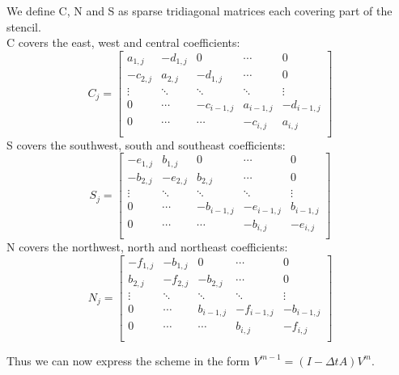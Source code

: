 \documentclass{article}
\begin{document}
\begin{enumerate}
We define C, N and S as sparse tridiagonal matrices each covering part of the stencil. \\
C covers the east, west and central coefficients:
\[
C_j = 
\begin{bmatrix}
    a_{1,j} & -d_{1,j} &0&\cdots&0 \\
    -c_{2,j} & a_{2,j} & -d_{1,j} &\cdots&0 \\
    \vdots & \ddots & \ddots & \ddots &\vdots \\
    0&\cdots&-c_{i-1,j} & a_{i-1,j} & -d_{i-1,j}\\
    0&\cdots&\cdots&-c_{i,j} & a_{i,j}\\
\end{bmatrix}\] 
S covers the southwest, south and southeast coefficients:
\[
S_j = 
\begin{bmatrix}
    -e_{1,j} & b_{1,j} & 0&\cdots&0 \\
    -b_{2,j} & -e_{2,j} & b_{2,j} &\cdots&0 \\
    \vdots & \ddots & \ddots & \ddots & \vdots \\
    0&\cdots&-b_{i-1,j} & -e_{i-1,j} & b_{i-1,j}\\
    0&\cdots&\cdots&-b_{i,j} & -e_{i,j}\\
\end{bmatrix}\] 
N covers the northwest, north and northeast coefficients:
\[
N_j = 
\begin{bmatrix}
    -f_{1,j} & -b_{1,j} & 0 &\cdots&0 \\
    b_{2,j} & -f_{2,j} & -b_{2,j} &\cdots&0 \\
    \vdots & \ddots & \ddots&\ddots&\vdots \\
    0&\cdots&b_{i-1,j} & -f_{i-1,j} & -b_{i-1,j}\\
    0&\cdots&\cdots&b_{i,j} & -f_{i,j}\\
\end{bmatrix}\] 

Thus we can now express the scheme in the form $V^{m-1} = (I-\Delta{t}A)V^m$.


\end{enumerate}
\end{document}
